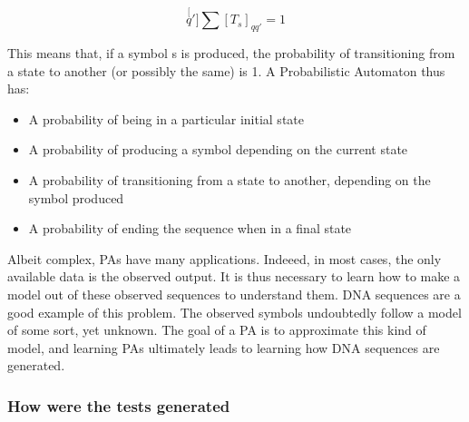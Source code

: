 \[
\stackrel[q']{}{\sum}[T_{s}]_{qq'}=1
\]


This means that, if a symbol s is produced, the probability of transitioning
from a state to another (or possibly the same) is 1. A Probabilistic
Automaton thus has:
\begin{itemize}
\item A probability of being in a particular initial state
\item A probability of producing a symbol depending on the current state
\item A probability of transitioning from a state to another, depending
on the symbol produced
\item A probability of ending the sequence when in a final state
\end{itemize}
Albeit complex, PAs have many applications. Indeeed, in most cases,
the only available data is the observed output. It is thus necessary
to learn how to make a model out of these observed sequences to understand
them. DNA sequences are a good example of this problem. The observed
symbols undoubtedly follow a model of some sort, yet unknown. The
goal of a PA is to approximate this kind of model, and learning PAs
ultimately leads to learning how DNA sequences are generated.


\subsubsection{How were the tests generated}

